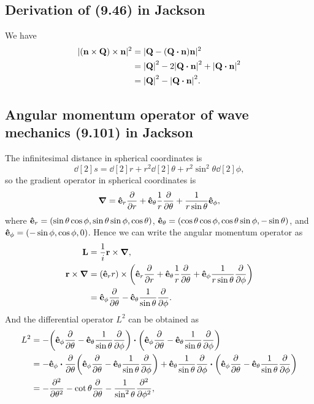 \documentclass[10pt]{article}
\begin{document}
\subsection{Derivation of (9.46) in Jackson}
We have
\begin{align*}
	|(\vb{n} \times \vb{Q}) \times \vb{n}|^2 &= |\vb{Q}- (\vb{Q} \vdot \vb{n}) \vb{n}|^2\\
	&= \abs{\vb{Q}}^2 - 2\abs{\vb{Q} \vdot \vb{n}}^2 + \abs{\vb{Q} \vdot \vb{n}}^2 \\
	&= \abs{\vb{Q}}^2 - \abs{\vb{Q} \vdot \vb{n}}^2.
\end{align*}

\subsection{Angular momentum operator of wave mechanics (9.101) in Jackson}
The infinitesimal distance in spherical coordinates is
\begin{equation}
	\dd[2]{s} = \dd[2]{r} + r^2 \dd[2]{\theta} + r^2 \sin^2{\theta} \dd[2]{\phi},
\end{equation}
so the gradient operator in spherical coordinates is
\begin{equation}
	\grad = \vu{e}_r \pdv{r} + \vu{e}_{\theta} \frac{1}{r} \pdv{\theta} + \frac{1}{r \sin{\theta}} \vu{e}_{\phi},
\end{equation}
where $\vu{e}_r = (\sin{\theta}\cos{\phi}, \sin{\theta}\sin{\phi}, \cos{\theta})$, $\vu{e}_{\theta} = (\cos{\theta} \cos{\phi}, \cos{\theta} \sin{\phi}, - \sin{\theta})$,
and $\vu{e}_{\phi} = (-\sin{\phi}, \cos{\phi}, 0)$.
Hence we can write the angular momentum operator as
\begin{align*}
	\vb{L} &= \frac{1}{i} \vb{r} \times \grad, \\
	\vb{r} \times \grad &= (\vu{e}_r r) \times \qty(\vu{e}_r \pdv{r} + \vu{e}_{\theta} \frac{1}{r} \pdv{\theta} + \vu{e}_{\phi} \frac{1}{r \sin{\theta}} \pdv{\phi}) \\
	&= \vu{e}_{\phi} \pdv{\theta} - \vu{e}_{\theta} \frac{1}{\sin{\theta}} \pdv{\phi}.
\end{align*}
And the differential operator $L^2$ can be obtained as
\begin{align*}
	L^2 &= -\qty(\vu{e}_{\phi} \pdv{\theta} - \vu{e}_{\theta} \frac{1}{\sin{\theta}} \pdv{\phi}) \vdot \qty(\vu{e}_{\phi} \pdv{\theta} - \vu{e}_{\theta} \frac{1}{\sin{\theta}} \pdv{\phi}) \\
	&= - \vu{e}_{\phi} \vdot \pdv{\theta} \qty(\vu{e}_{\phi} \pdv{\theta} - \vu{e}_{\theta} \frac{1}{\sin{\theta}} \pdv{\phi})
	+ \vu{e}_{\theta} \frac{1}{\sin{\theta}} \pdv{\phi} \vdot \qty(\vu{e}_{\phi} \pdv{\theta} - \vu{e}_{\theta} \frac{1}{\sin{\theta}} \pdv{\phi}) \\
	&= -\pdv[2]{\theta} - \cot{\theta} \pdv{\theta} -\frac{1}{\sin^2{\theta}} \pdv[2]{\phi},
\end{align*}
\end{document}
